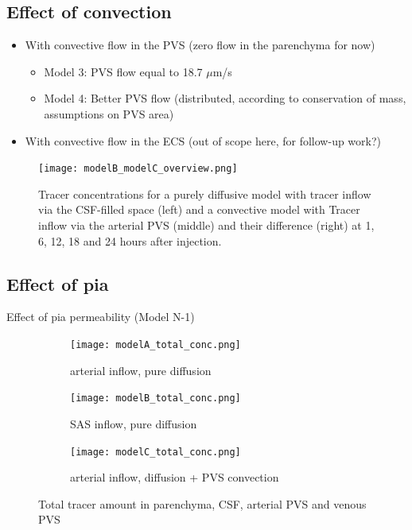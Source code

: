 \subsection*{Effect of convection}
\begin{itemize}
    \item 
    With convective flow in the PVS (zero flow in the parenchyma for now)
    \begin{itemize}
        \item 
        Model 3: PVS flow equal to 18.7 $\mu$m/s
        \item 
        Model 4: Better PVS flow (distributed, according to conservation of mass, assumptions on PVS area)
    \end{itemize}    
    \item 
    With convective flow in the ECS (out of scope here, for follow-up work?)
\end{itemize}

\begin{figure}
    \centering
    \texttt{[image: modelB\_modelC\_overview.png]}
    \caption{Tracer concentrations for a purely diffusive model with tracer inflow via the CSF-filled space (left) and a convective model with Tracer inflow via the arterial PVS (middle) and their difference (right) at 1, 6, 12, 18 and 24 hours after injection.}
    \label{fig:2}
\end{figure}

\subsection*{Effect of pia}
  
Effect of pia permeability (Model N-1)    

\begin{figure}
     \centering
     \begin{subfigure}[b]{0.33\textwidth}
         \centering
         \texttt{[image: modelA\_total\_conc.png]}
         \caption{arterial inflow, pure diffusion}
         \label{fig:y equals x}
     \end{subfigure}
     \hfill
     \begin{subfigure}[b]{0.33\textwidth}
         \centering
         \texttt{[image: modelB\_total\_conc.png]}
         \caption{SAS inflow, pure diffusion}
         \label{fig:three sin x}
     \end{subfigure}
     \hfill
     \begin{subfigure}[b]{0.33\textwidth}
         \centering
         \texttt{[image: modelC\_total\_conc.png]}
         \caption{arterial inflow, diffusion + PVS convection}
         \label{fig:five over x}
     \end{subfigure}
        \caption{Total tracer amount in parenchyma, CSF, arterial PVS and venous PVS}
        \label{fig:three graphs}
\end{figure}

